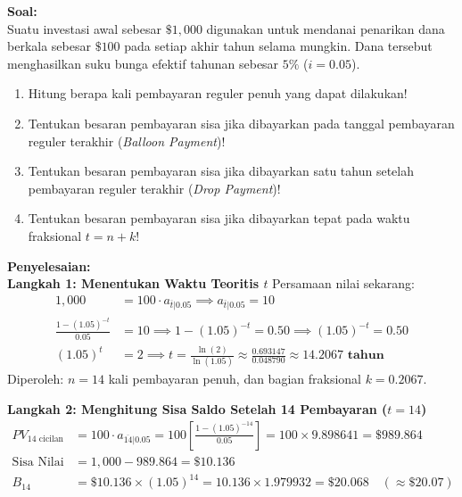 \documentclass[11pt,a4paper]{article}
\begin{document}
\begin{examplebox}
\textbf{Soal:}\\
Suatu investasi awal sebesar $\$1{,}000$ digunakan untuk mendanai penarikan dana berkala sebesar $\$100$ pada setiap akhir tahun selama mungkin. Dana tersebut menghasilkan suku bunga efektif tahunan sebesar $5\%$ ($i = 0.05$).
\begin{enumerate}[label=(\alph*)]
    \item Hitung berapa kali pembayaran reguler penuh yang dapat dilakukan!
    \item Tentukan besaran pembayaran sisa jika dibayarkan pada tanggal pembayaran reguler terakhir (\textit{Balloon Payment})!
    \item Tentukan besaran pembayaran sisa jika dibayarkan satu tahun setelah pembayaran reguler terakhir (\textit{Drop Payment})!
    \item Tentukan besaran pembayaran sisa jika dibayarkan tepat pada waktu fraksional $t = n + k$!
\end{enumerate}

\vspace{0.5em}
\textbf{Penyelesaian:}\\
\textbf{Langkah 1: Menentukan Waktu Teoritis $t$}
Persamaan nilai sekarang:
\begin{align*}
    1{,}000 &= 100 \cdot a_{\overline{t}|0.05} \implies a_{\overline{t}|0.05} = 10 \\[0.4em]
    \frac{1 - (1.05)^{-t}}{0.05} &= 10 \implies 1 - (1.05)^{-t} = 0.50 \implies (1.05)^{-t} = 0.50 \\[0.4em]
    (1.05)^t &= 2 \implies t = \frac{\ln(2)}{\ln(1.05)} \approx \frac{0.693147}{0.048790} \approx \mathbf{14.2067 \text{ tahun}}
\end{align*}
Diperoleh: $n = 14$ kali pembayaran penuh, dan bagian fraksional $k = 0.2067$.

\textbf{Langkah 2: Menghitung Sisa Saldo Setelah 14 Pembayaran ($t = 14$)}
\begin{align*}
    PV_{14 \text{ cicilan}} &= 100 \cdot a_{\overline{14}|0.05} = 100 \left[\frac{1 - (1.05)^{-14}}{0.05}\right] = 100 \times 9.898641 = \$989.864 \\[0.4em]
    \text{Sisa Nilai Sekarang} &= 1{,}000 - 989.864 = \$10.136 \\[0.4em]
    B_{14} &= \$10.136 \times (1.05)^{14} = 10.136 \times 1.979932 = \mathbf{\$20.068} \quad (\approx \$20.07)
\end{align*}


\end{examplebox}
\end{document}
